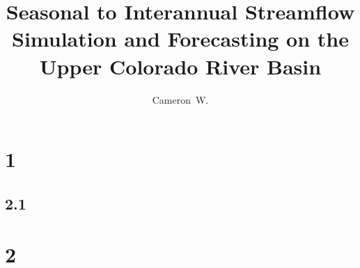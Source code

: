 \documentclass[defaultstyle,11pt]{thesis}
\title{Seasonal to Interannual Streamflow Simulation and Forecasting on the Upper Colorado River Basin}
\author{Cameron~W.}{Bracken}
\begin{document}
\tableofcontents{}
\section{1}
\subsection{2.1}
\section{2}








\end{document}
